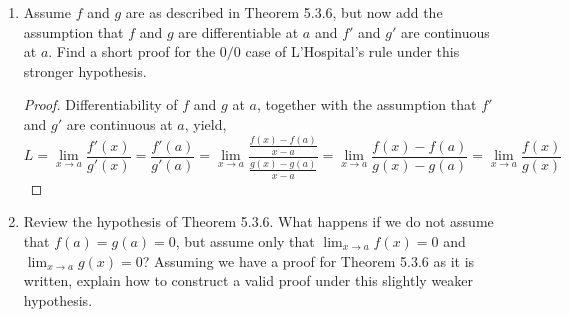\begin{enumerate}
\item Assume \( f \) and \( g \) are as described in Theorem 5.3.6, but now add the assumption that \( f \) and \( g \) are differentiable at \( a \) and \( f' \) and \( g' \) are continuous at \( a \). Find a short proof for the \( 0/0 \) case of L'Hospital's rule under this stronger hypothesis.

\begin{proof}
Differentiability of \( f \) and \( g \) at \( a \), together with the assumption that \( f' \) and \( g' \) are continuous at \( a \), yield,
\[
L = \lim_{x \rightarrow a} \frac{f'(x)}{g'(x)} = \frac{f'(a)}{g'(a)} = \lim_{x \rightarrow a} \frac{\frac{f(x)-f(a)}{x-a}}{\frac{g(x)-g(a)}{x-a}} = \lim_{x \rightarrow a} \frac{f(x)-f(a)}{g(x)-g(a)} = \lim_{x \rightarrow a} \frac{f(x)}{g(x)}
\]
\end{proof}

\item Review the hypothesis of Theorem 5.3.6. What happens if we do not assume that \( f(a) = g(a) = 0 \), but assume only that \( \lim_{x \rightarrow a} f(x) = 0 \) and \( \lim_{x \rightarrow a} g(x) = 0 \)? Assuming we have a proof for Theorem 5.3.6 as it is written, explain how to construct a valid proof under this slightly weaker hypothesis.











\end{enumerate}
